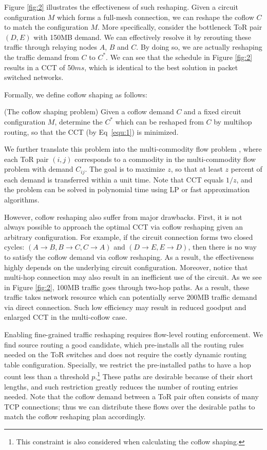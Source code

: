Figure \ref{fig:2} illustrates the effectiveness of such reshaping.
Given a circuit configuration $M$ which forms a full-mesh connection, we can reshape the coflow $C$ to match the configuration $M$.
More specifically, consider the bottleneck ToR pair $(D, E)$ with 150MB demand.
We can effectively resolve it by rerouting these traffic through relaying nodes $A$, $B$ and $C$.
By doing so, we are actually reshaping the traffic demand from $C$ to $C^*$.
We can see that the schedule in Figure \ref{fig:2} results in a CCT of 50$ms$, which is identical to the best solution in packet switched networks.

Formally, we define coflow shaping as follows:
\begin{problem} (The coflow shaping problem)
\label{problem:2}
Given a coflow demand $C$ and a fixed circuit configuration $M$, determine the $C^*$ which can be reshaped from $C$ by multihop routing, so that the CCT (by Eq~\eqref{equ:1}) is minimized.
\end{problem}
We further translate this problem into the multi-commodity flow problem \cite{introduction}, where each ToR pair $(i,j)$ corresponds to a commodity in the multi-commodity flow problem with demand $C_{ij}$.
The goal is to maximize $z$, so that at least $z$ percent of each demand is transferred within a unit time.
Note that CCT equals $1/z$, and the problem can be solved in polynomial time using LP or fast approximation algorithms.

However, coflow reshaping also suffer from major drawbacks.
First, it is not always possible to approach the optimal CCT via coflow reshaping given an arbitrary configuration.
For example, if the circuit connection forms two closed cycles: $(A\rightarrow B, B\rightarrow C, C\rightarrow A)$ and $(D\rightarrow E, E\rightarrow D)$, then there is no way to satisfy the coflow demand via coflow reshaping.
As a result, the effectiveness highly depends on the underlying circuit configuration.
Moreover, notice that multi-hop connection may also result in an inefficient use of the circuit. As we see in Figure \ref{fig:2}, 100MB traffic goes through two-hop paths. As a result, these traffic takes network resource which can potentially serve 200MB traffic demand via direct connection. Such low efficiency may result in reduced goodput and enlarged CCT in the multi-coflow case.

Enabling fine-grained traffic reshaping requires flow-level routing enforcement. We find source routing a good candidate, which pre-installs all the routing rules needed on the ToR switches and does not require the costly dynamic routing table configuration. Specially, we restrict the pre-installed paths to have a hop count less than a threshold $p$.\footnote{This constraint is also considered when calculating the coflow shaping.}
These paths are desirable because of their short lengths, and such restriction greatly reduces the number of routing entries needed.
Note that the coflow demand between a ToR pair often consists of many TCP connections; thus we can distribute these flows over the desirable paths to match the coflow reshaping plan accordingly.

